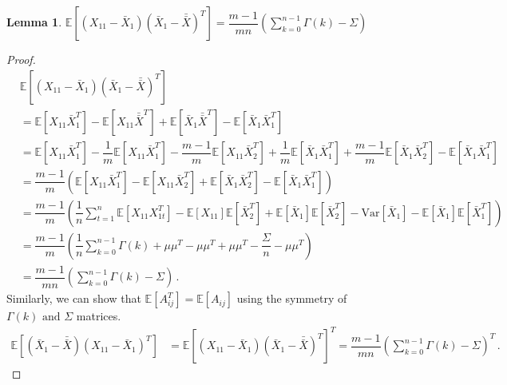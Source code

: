 \documentclass[12pt]{article}
\newtheorem{lemma}{Lemma}
\theoremstyle{remark}
\begin{document}
 
\begin{lemma} \label{lemma:bias1}
$\mathbb{E}\left[ \left(X_{11} - \bar{X}_1 \right) \left(\bar{X}_1 - \bar{\bar{X}} \right)^T \right] = \dfrac{m-1}{mn}\left(\sum\limits_{k=0}^{n-1}\Gamma(k) - \Sigma\right)$
\end{lemma}
\begin{proof}
\begin{align*}
    &\mathbb{E} \left[ \left(X_{11} - \bar{X}_1 \right) \left(\bar{X}_1 - \bar{\bar{X}} \right)^T \right]\\
     &= \mathbb{E} \left[X_{11}\bar{X}_1^T \right] - \mathbb{E}\left[X_{11}\bar{\bar{X}}^T \right] + \mathbb{E} \left[\bar{X}_1\bar{\bar{X}}^T \right] - \mathbb{E} \left[\bar{X}_1\bar{X}_1^T \right]\\
    &= \mathbb{E} \left[X_{11}\bar{X}_1^T \right] - \dfrac{1}{m}\mathbb{E} \left[X_{11}\bar{X}_1^T \right] - \dfrac{m-1}{m}\mathbb{E} \left[X_{11}\bar{X}_2^T \right] + \dfrac{1}{m}\mathbb{E} \left[\bar{X}_1\bar{X}_1^T \right] + \dfrac{m-1}{m}\mathbb{E} \left[\bar{X}_1\bar{X}_2^T \right] - \mathbb{E} \left[\bar{X}_1\bar{X}_1^T \right]\\
    &= \dfrac{m-1}{m}\left(\mathbb{E} \left[X_{11}\bar{X}_1^T \right] - \mathbb{E} \left[X_{11}\bar{X}_2^T \right] + \mathbb{E} \left[\bar{X}_1\bar{X}_2^T \right] - \mathbb{E} \left[\bar{X}_1\bar{X}_1^T \right]\right)\\
    &= \dfrac{m-1}{m}\left(\dfrac{1}{n}\sum_{t=1}^{n}\mathbb{E} \left[X_{11}X_{1t}^T \right] - \mathbb{E}\left[X_{11}\right] \mathbb{E}\left[\bar{X}_2^T \right] + \mathbb{E} \left[\bar{X}_1\right]\mathbb{E}\left[\bar{X}_2^T\right] - \text{Var}\left[\bar{X}_1 \right] - \mathbb{E}\left[\bar{X}_1 \right]\mathbb{E}\left[\bar{X}_1^T \right]\right)\\
    &= \dfrac{m-1}{m}\left(\dfrac{1}{n}\sum_{k=0}^{n-1}\Gamma(k) + \mu \mu^T - \mu \mu^T + \mu \mu^T - \dfrac{\Sigma}{n} - \mu \mu^T\right)\\
    &= \dfrac{m-1}{mn}\left(\sum_{k=0}^{n-1}\Gamma(k) - \Sigma\right)\,.
\end{align*}
%
Similarly, we can show that $\mathbb{E}[A_{ij}^T] = \mathbb{E}[A_{ij}]$ using the symmetry of $\Gamma(k) \textrm{ and } \Sigma$ matrices.
%    
\begin{align*}
    \mathbb{E} \left[ \left(\bar{X}_1 - \bar{\bar{X}} \right)  \left(X_{11} - \bar{X}_1 \right)^T \right] &= \mathbb{E}\left[ \left(X_{11} - \bar{X}_1 \right) \left(\bar{X}_1 - \bar{\bar{X}} \right)^T \right]^T = \dfrac{m-1}{mn}\left(\sum_{k=0}^{n-1}\Gamma(k) - \Sigma \right)^T\,.
\end{align*}
\end{proof}
\end{document}
